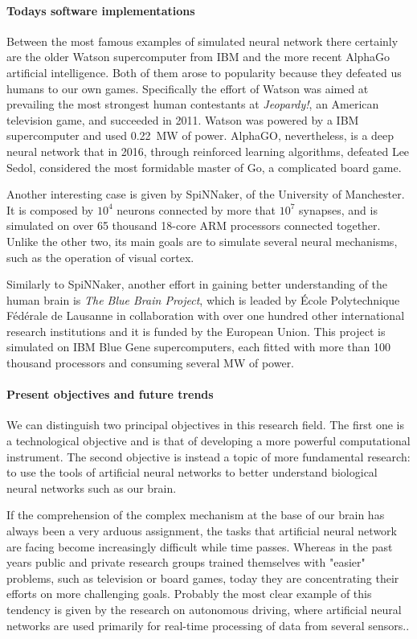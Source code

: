 \paragraph{Todays software implementations\\}
Between the most famous examples of simulated neural network there certainly are the older Watson supercomputer from IBM and the more recent AlphaGo artificial intelligence.
Both of them arose to popularity because they defeated us humans to our own games.
Specifically the effort of Watson was aimed at prevailing the most strongest human contestants at \textit{Jeopardy!}, an American television game, and succeeded in 2011.
Watson was powered by a IBM supercomputer and used \SI{0.22}{\MW} of power.
AlphaGO, nevertheless, is a deep neural network that in 2016, through reinforced learning algorithms, defeated Lee Sedol, considered the most formidable master of Go, a complicated board game.

Another interesting case is given by SpiNNaker, of the University of Manchester.
It is composed by $10^4$ neurons connected by more that $10^7$ synapses, and is simulated on over 65 thousand 18-core ARM processors connected together.
Unlike the other two, its main goals are to simulate several neural mechanisms, such as the
operation of visual cortex.

Similarly to SpiNNaker, another effort in gaining better understanding of the human brain is \textit{The Blue Brain Project}, which is leaded by École Polytechnique Fédérale de Lausanne in collaboration with over one hundred other international research institutions and it is funded by the European Union.
This project is simulated on IBM Blue Gene supercomputers, each fitted with more than 100 thousand processors and consuming several \si{\MW} of power.

\paragraph{Present objectives and future trends\\}
We can distinguish two principal objectives in this research field.
The first one is a technological objective and is that of developing a more powerful computational instrument.
The second objective is instead a topic of more fundamental research: to use the tools of artificial neural networks to better understand biological neural networks such as our brain.

If the comprehension of the complex mechanism at the base of our brain has always been a very arduous assignment, the tasks that artificial neural network are facing become increasingly difficult while time passes.
Whereas in the past years public and private research groups trained themselves with "easier" problems, such as television or board games, today they are concentrating their efforts on more challenging goals.
Probably the most clear example of this tendency is given by the research on autonomous driving, where artificial neural networks are used primarily for real-time processing of data from several sensors..

